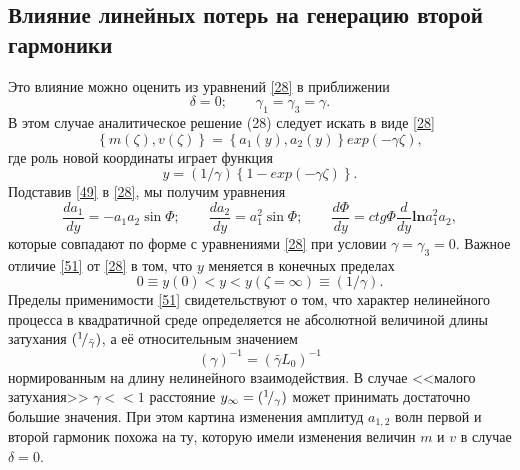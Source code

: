 \documentclass[a4paper]{article}
\begin{document}
	\subsection{Влияние линейных потерь на генерацию второй гармоники }
	Это влияние можно оценить из уравнений \eqref{28} в приближении
	\begin{equation}
		\delta=0;\qquad\gamma_{1}=\gamma_{3}=\gamma.\label{48}
	\end{equation}
	В этом случае аналитическое решение (28) следует искать в виде \eqref{28}
	\begin{equation}
		\left\{m(\zeta),v(\zeta)\right\}=\left\{a_{1}(y),a_{2}(y)\right\}exp(-\gamma\zeta),\label{49}
	\end{equation}
	где роль новой координаты играет функция 
	\begin{equation}
		y=(1/\gamma)\left\{1-exp(-\gamma\zeta)\right\}.\label{50}
	\end{equation}
	Подставив \eqref{49} в \eqref{28}, мы получим уравнения
	\begin{equation}
		\frac{da_{1}}{dy}=-a_{1}a_{2}\sin\Phi;\qquad\frac{da_{2}}{dy}=a_{1}^{2}\sin\Phi;\qquad\frac{d\Phi}{dy}=ctg\Phi\frac{d}{dy}\textbf{ln}a_{1}^{2}a_{2},\label{51}
	\end{equation}
	которые совпадают по форме с уравнениями \eqref{28} при условии $\gamma=\gamma_{3}=0$. Важное отличие \eqref{51} от \eqref{28} в том, что $y$ меняется в конечных пределах $$0\equiv y(0)<y<y(\zeta=\infty)\equiv(1/\gamma).$$
	Пределы применимости \eqref{51} свидетельствуют о том, что характер нелинейного процесса в квадратичной среде определяется не абсолютной величиной длины затухания $({}^{1}\!/_{\bar{\gamma}})$, а её относительным значением 
	\begin{equation}
		(\gamma)^{-1}=(\bar{\gamma}L_{0})^{-1}\label{52}
	\end{equation}
	нормированным на длину нелинейного взаимодействия. В случае <<малого затухания>> $\gamma<<1$ расстояние  $y_{\infty}=({}^{1}\!/_{\gamma})$ может принимать достаточно большие значения. При этом картина изменения амплитуд $a_{1,2}$ волн первой и второй гармоник похожа на ту, которую имели изменения величин $m$ и $v$ в случае $\delta=0$. 
	
\end{document}
